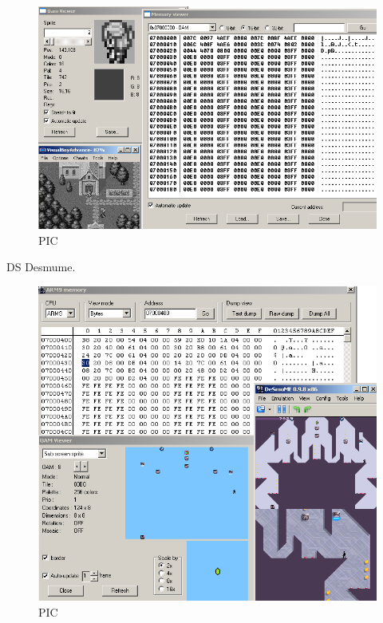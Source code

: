 \documentclass[
]{book}
\begin{document}
\begin{figure}
\centering
\includegraphics{images/32_home_fast6191_romhackingguide_unrenamed_files_and_original_borders_romhackingguide2dOAMvba_2.png}
\caption{PIC}
\end{figure}

DS Desmume.

\begin{figure}
\centering
\includegraphics{images/33_home_fast6191_romhackingguide_unrenamed_file___ginal_borders_romhackingguide2dOAMdesmume_1.png}
\caption{PIC}
\end{figure}
\end{document}
